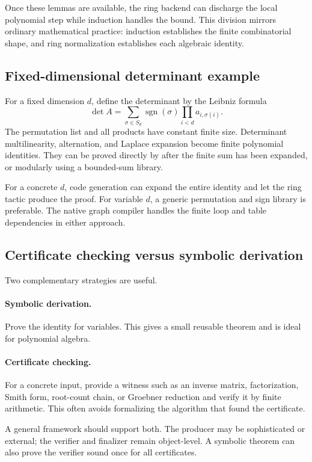 Once these lemmas are available, the ring backend can discharge the local
polynomial step while induction handles the bound.  This division mirrors
ordinary mathematical practice: induction establishes the finite combinatorial
shape, and ring normalization establishes each algebraic identity.

\subsection{Fixed-dimensional determinant example}

For a fixed dimension \(d\), define the determinant by the Leibniz formula
\[
  \det A=\sum_{\sigma\in S_d}\operatorname{sgn}(\sigma)
           \prod_{i<d}a_{i,\sigma(i)}.
\]
The permutation list and all products have constant finite size.  Determinant
multilinearity, alternation, and Laplace expansion become finite polynomial
identities.  They can be proved directly by  after the finite
sum has been expanded, or modularly using a bounded-sum library.

For a concrete \(d\), code generation can expand the entire identity and let
the ring tactic produce the proof.  For variable \(d\), a generic permutation
and sign library is preferable.  The native graph compiler handles the finite
loop and table dependencies in either approach.

\subsection{Certificate checking versus symbolic derivation}

Two complementary strategies are useful.

\paragraph{Symbolic derivation.}
Prove the identity for variables.  This gives a small reusable theorem and is
ideal for polynomial algebra.

\paragraph{Certificate checking.}
For a concrete input, provide a witness such as an inverse matrix, factorization,
Smith form, root-count chain, or Groebner reduction and verify it by finite
arithmetic.  This often avoids formalizing the algorithm that found the
certificate.

A general framework should support both.  The producer may be sophisticated or
external; the verifier and finalizer remain object-level.  A symbolic theorem
can also prove the verifier sound once for all certificates.

